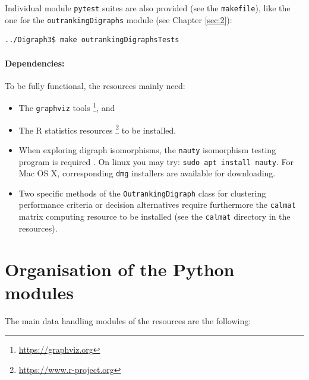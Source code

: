 Individual module \texttt{pytest} suites are also provided (see the \texttt{makefile}), like the one for the \texttt{outrankingDigraphs} module (see Chapter \ref{sec:2}):
\begin{lstlisting}[language=sh, backgroundcolor=\color{White}, numbers=none]
../Digraph3$ make outrankingDigraphsTests
\end{lstlisting}

\paragraph{\textbf{Dependencies:}}

\noindent To be fully functional, the \Digraph resources mainly need:

\begin{itemize}[leftmargin=0.5cm,listparindent=0em,rightmargin=0.2cm,topsep=1pt]
\item The \texttt{graphviz} tools \citep{graphViz}\footnote{\href{https://graphviz.org}{https://graphviz.org}}, and 
\item The R statistics resources \footnote{\href{https://www.r-project.org}{https://www.r-project.org}} to be installed.
\item When exploring digraph isomorphisms, the \texttt{nauty} isomorphism testing program is required \citep*{nauty}. On linux you may try: \texttt{sudo apt install nauty}. For Mac OS X, corresponding \texttt{dmg} installers are available for downloading.
\item Two specific methods of the \texttt{OutrankingDigraph} class for clustering performance criteria or decision alternatives require furthermore the \texttt{calmat} matrix computing resource to be installed (see the \texttt{calmat} directory in the \Digraph resources).
\end{itemize}

\section{Organisation of the \Digraph Python modules}
\label{sec:1.2}

The main data handling modules of the \Digraph resources are the following:

